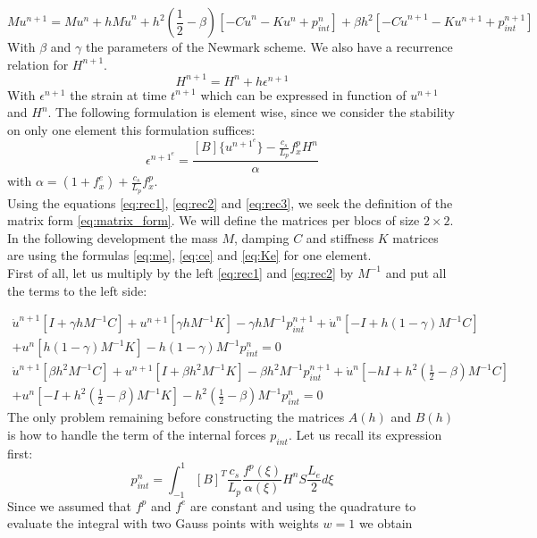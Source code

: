 \begin{equation}
    M u^{n+1} = M u^{n} + h M \dot{u}^n + h^2(\frac{1}{2}-\beta)\left[ -C \Dot{u}^n - K u^n +p_{int}^n   \right] + \beta h^2 \left[ -C \Dot{u}^{n+1} - K u^{n+1} +p_{int}^{n+1} \right]
    \label{eq:rec2}
\end{equation}
With $\beta$ and $\gamma$ the parameters of the Newmark scheme. We also have a recurrence relation for $H^{n+1}$. 
\begin{equation}
    H^{n+1} = H^n + h \epsilon^{n+1}
    \label{eq:rec3}
\end{equation}
With $\epsilon^{n+1}$ the strain at time $t^{n+1}$ which can be expressed in function of $u^{n+1}$ and $H^n$. The following formulation is element wise, since we consider the stability on only one element this formulation suffices:
\begin{equation}
    \epsilon^{{n+1}^e} = \frac{[B]\{u^{{n+1}^e}\} - \frac{c_s}{L_p} f^p_x H^n}{\alpha}
    \label{eq:eps}
\end{equation}
with $\alpha = (1+f^e_x)+\frac{c_s}{L_p} f^p_x $.\\ 
Using the equations \ref{eq:rec1}, \ref{eq:rec2} and \ref{eq:rec3}, we seek the definition of the matrix form \ref{eq:matrix_form}. We will define the matrices per blocs of size $2 \times 2$. In the following development the mass $M$, damping $C$ and stiffness $K$ matrices are using the formulas \ref{eq:me}, \ref{eq:ce} and \ref{eq:Ke} for one element.  \\
First of all, let us multiply by the left \ref{eq:rec1} and \ref{eq:rec2} by $M^{-1}$ and put all the terms to the left side:

\begin{multline}
    \dot{u}^{n+1}\left[I + \gamma h M^{-1}C\right] + u^{n+1}\left[\gamma h M^{-1}K \right] -\gamma h M^{-1} p_{int}^{n+1}  
    + \dot{u}^n\left[-I + h(1-\gamma)M^{-1}C   \right] \\+ u^n\left[ h(1-\gamma) M^{-1}K \right] - h(1-\gamma)M^{-1} p_{int}^n = 0
\end{multline}
\begin{multline}
    \dot{u}^{n+1}\left[\beta h^2 M^{-1} C \right] +  u^{n+1}\left[I+\beta h^2 M^{-1} K  \right] - \beta h^2 M^{-1} p_{int}^{n+1} + \dot{u}^n \left[ -h I + h^2(\frac{1}{2}-\beta) M^{-1} C \right] \\
    + u^n\left[-I + h^2(\frac{1}{2}-\beta) M^{-1} K \right] - h^2(\frac{1}{2}-\beta) M^{-1}p^n_{int}=0
\end{multline}
The only problem remaining before constructing the matrices $A(h)$ and $B(h)$ is how to handle the term of the internal forces $p_{int}$.
Let us recall its expression first:
\begin{equation}
    p_{int}^n = \int^{1}_{-1}[B]^T\frac{c_s}{L_p}\frac{f^p(\xi)}{\alpha(\xi)} H^n S  \frac{L_e}{2} d\xi
\end{equation}
Since we assumed that $f^p$ and $f^e$ are constant and using the quadrature to evaluate the integral with two Gauss points with weights $w=1$  we obtain

